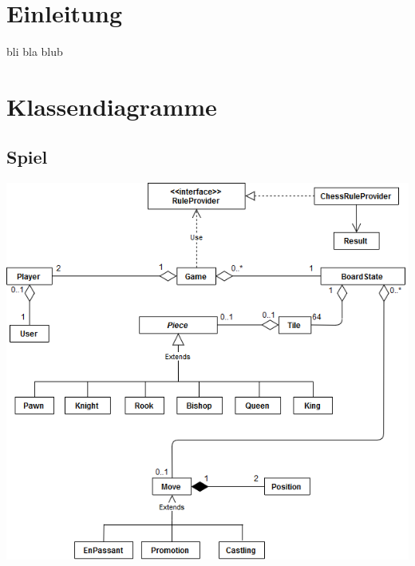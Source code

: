 \documentclass[parskip=full]{scrartcl}
\begin{document}
	\section{Einleitung}
		bli bla blub
	\section{Klassendiagramme}
	
		\subsection{Spiel}
		
		\begin{minipage}{\linewidth}
			\centering
			\includegraphics[width=1\linewidth]{Diagramme/TotalGame}
			\label{fig:totalGame}
		\end{minipage}
		\newpage
\end{document}
